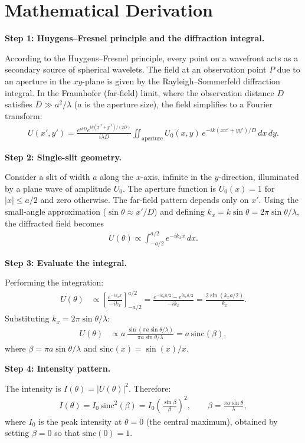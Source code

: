 \section*{Mathematical Derivation}

\textbf{Step 1: Huygens--Fresnel principle and the diffraction integral.}

According to the Huygens--Fresnel principle, every point on a wavefront acts as a secondary source of spherical wavelets. The field at an observation point $P$ due to an aperture in the $xy$-plane is given by the Rayleigh--Sommerfeld diffraction integral. In the Fraunhofer (far-field) limit, where the observation distance $D$ satisfies $D \gg a^2/\lambda$ ($a$ is the aperture size), the field simplifies to a Fourier transform:
\begin{align}
U(x', y') = \frac{e^{ikD}e^{ik(x'^2+y'^2)/(2D)}}{i\lambda D}\iint_{\text{aperture}} U_0(x,y)\,e^{-ik(xx'+yy')/D}\,dx\,dy.
\end{align}

\textbf{Step 2: Single-slit geometry.}

Consider a slit of width $a$ along the $x$-axis, infinite in the $y$-direction, illuminated by a plane wave of amplitude $U_0$. The aperture function is $U_0(x) = 1$ for $|x| \leq a/2$ and zero otherwise. The far-field pattern depends only on $x'$. Using the small-angle approximation ($\sin\theta \approx x'/D$) and defining $k_x = k\sin\theta = 2\pi\sin\theta/\lambda$, the diffracted field becomes
\begin{align}
U(\theta) \propto \int_{-a/2}^{a/2} e^{-ik_x x}\,dx.
\end{align}

\textbf{Step 3: Evaluate the integral.}

Performing the integration:
\begin{align}
U(\theta) &\propto \left[\frac{e^{-ik_x x}}{-ik_x}\right]_{-a/2}^{a/2} = \frac{e^{-ik_x a/2} - e^{ik_x a/2}}{-ik_x} = \frac{2\sin(k_x a/2)}{k_x}.
\end{align}
Substituting $k_x = 2\pi\sin\theta/\lambda$:
\begin{align}
U(\theta) &\propto a\,\frac{\sin(\pi a\sin\theta/\lambda)}{\pi a\sin\theta/\lambda} = a\,\text{sinc}(\beta),
\end{align}
where $\beta = \pi a\sin\theta/\lambda$ and $\text{sinc}(x) = \sin(x)/x$.

\textbf{Step 4: Intensity pattern.}

The intensity is $I(\theta) = |U(\theta)|^2$. Therefore:
\begin{align}
I(\theta) = I_0\,\text{sinc}^2(\beta) = I_0\left(\frac{\sin\beta}{\beta}\right)^{\!2}, \qquad \beta = \frac{\pi a\sin\theta}{\lambda},
\end{align}
where $I_0$ is the peak intensity at $\theta = 0$ (the central maximum), obtained by setting $\beta = 0$ so that $\text{sinc}(0) = 1$.

